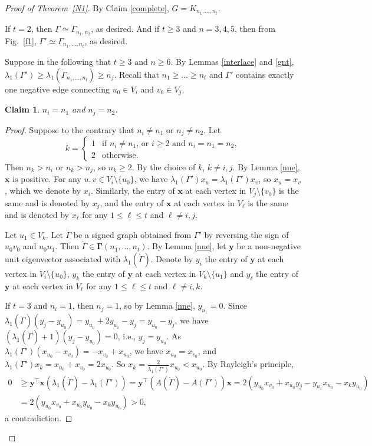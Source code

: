 \documentclass[12pt]{article}
\numberwithin{equation}{section}
\newtheorem {Claim} {Claim}[section]
\begin{document}
\begin{proof}[Proof of Theorem~\ref{N1}]
  
By Claim \ref{complete}, $G=K_{n_1, \dots, n_t}$. 

If $t=2$, then $\Gamma\simeq \Gamma_{n_1, n_2}$, as desired. And if $t\ge 3$ and $n=3,4,5$, then from Fig.~\ref{f1}, $\Gamma'\simeq \Gamma_{n_1, \dots, n_t}$, as desired. 

Suppose in the following that $t\ge 3$ and $n\ge 6$. 
By Lemmas \ref{interlace} and \ref{gnt}, $\lambda_1(\Gamma')\ge\lambda_1(\dot\Gamma_{n_1, \dots, n_t})\ge n_j$. Recall that $n_1\ge \dots\ge n_t$ and $\Gamma'$ contains exactly one negative edge connecting  $u_0\in V_i$ and $v_0\in V_j$.

\begin{Claim}\label{large}
$n_i=n_1$ and $n_j=n_2$.  
\end{Claim}


\begin{proof}
Suppose to the contrary that $n_i\ne n_1$ or $n_j\ne n_2$.
Let 
\[
k=\begin{cases}
1 &  \mbox{if $n_i\ne n_1$, or $i\ge 2$ and $n_i=n_1=n_2$},\\
2 &  \mbox{otherwise}.
\end{cases}
\]
Then $n_k> n_i$ or $n_k> n_j$, so $n_k\ge 2$. By the choice of $k$, $k\ne i,j$. 
By Lemma \ref{nne}, $\mathbf{x}$ is positive. 
For any $u, v\in V_i\setminus \{u_0\}$, we have  $\lambda_1(\Gamma')x_u=\lambda_1(\Gamma')x_v$, so $x_u=x_v$, which we denote by $x_i$. 
Similarly, the entry of $\mathbf{x}$ at each vertex in $V_j\setminus\{v_0\}$ is the same and is denoted by $x_j$,  and  the entry of $\mathbf{x}$ at each vertex in $V_\ell$ is the same and is denoted by $x_\ell$
for any $1\le \ell \le t$ and $\ell\ne i, j$. 

Let $u_1\in V_k$.  
Let $\dot{\Gamma}$ be a signed graph obtained from $\Gamma'$ by reversing the sign of $u_0v_0$ and $u_0u_1$. Then $\dot{\Gamma}\in \boldsymbol\Gamma(n_1,\dots, n_t)$. By Lemma \ref{nne}, let $\mathbf{y}$ be a non-negative unit eigenvector associated with $\lambda_1(\dot{\Gamma})$. Denote by $y_i$ the entry of $\mathbf{y}$ at each vertex in $V_i\setminus\{u_0\}$, $y_k$ the entry of $\mathbf{y}$ at each vertex in $V_k\setminus\{u_1\}$ and $y_\ell$ the entry of $\mathbf{y}$ at each vertex in $V_\ell$ for any $1\le \ell \le t$ and $\ell\ne i, k$. 

If $t=3$ and $n_i=1$, then $n_j=1$, so by Lemma \ref{nne}, $y_{u_1}=0$. Since $\lambda_1(\dot{\Gamma})(y_j-y_{u_0})=y_{u_0}+2y_{u_1}-y_j=y_{u_0}-y_j$, we have $(\lambda_1(\dot{\Gamma})+1)(y_j-y_{u_0})=0$, i.e., $y_j=y_{u_0}$. 
As $\lambda_1(\Gamma')(x_{u_0}-x_{v_0})=-x_{v_0}+x_{u_0}$, we have $x_{u_0}=x_{v_0}$, and $\lambda_1(\Gamma')x_k=x_{u_0}+x_{v_0}=2x_{u_0}$. 
So $x_k=\frac{2}{\lambda_1(\Gamma')}x_{u_0}<x_{u_0}$. 
By Rayleigh's principle, 
\begin{align*}
0& \ge \mathbf{y}^\top\mathbf{x}(\lambda_1(\dot{\Gamma})-\lambda_1(\Gamma'))= \mathbf{y}^\top\left(A(\dot{\Gamma})-A(\Gamma')\right)\mathbf{x}=2\left(y_{u_0}x_{v_0}+x_{u_0}y_j-y_{u_1}x_{u_0}-x_ky_{u_0}\right)\\
& =2\left(y_{u_0}x_{v_0}+x_{u_0}y_{u_0}-x_ky_{u_0}\right)>0, 
\end{align*}
a contradiction.


\end{proof}
\end{proof}
\end{document}
